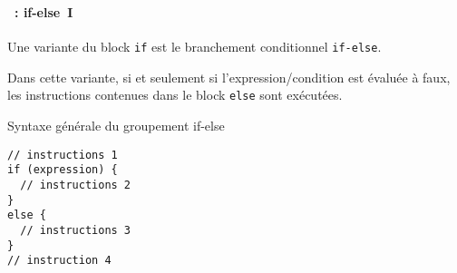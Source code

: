 \begin{frame}[containsverbatim]
  \frametitle{\secname}
  \framesubtitle{\subsecname~: if-else~I}

  Une variante du block \verb|if| est le branchement conditionnel \verb|if-else|.
  \vspace{0.3cm}
  \par
  Dans cette variante, si et seulement si l'expression/condition est évaluée à faux, les instructions contenues dans le block \verb|else| sont exécutées.
  \begin{block}{Syntaxe générale du groupement if-else}
     \begin{verbatim}
// instructions 1
if (expression) {
  // instructions 2
}
else {
  // instructions 3
}
// instruction 4\end{verbatim}
  \end{block}
\end{frame}


